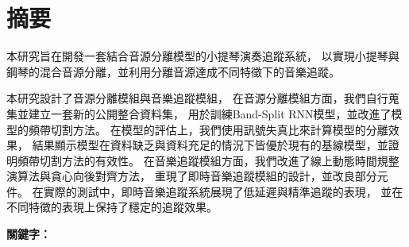\documentclass[class=NCU_thesis, crop=false]{standalone}
\begin{document}
\chapter{摘要}

本研究旨在開發一套結合音源分離模型的小提琴演奏追蹤系統，
以實現小提琴與鋼琴的混合音源分離，並利用分離音源達成不同特徵下的音樂追蹤。

本研究設計了音源分離模組與音樂追蹤模組，
在音源分離模組方面，我們自行蒐集並建立一套新的公開整合資料集，
用於訓練Band-Split RNN模型，並改進了模型的頻帶切割方法。
在模型的評估上，我們使用訊號失真比來計算模型的分離效果，
結果顯示模型在資料缺乏與資料充足的情況下皆優於現有的基線模型，並證明頻帶切割方法的有效性。
在音樂追蹤模組方面，我們改進了線上動態時間規整演算法與貪心向後對齊方法，
重現了即時音樂追蹤模組的設計，並改良部分元件。
在實際的測試中，即時音樂追蹤系統展現了低延遲與精準追蹤的表現，
並在不同特徵的表現上保持了穩定的追蹤效果。


\vspace{2em}
\noindent \textbf{關鍵字：} \keywordsZh{} %
\end{document}

